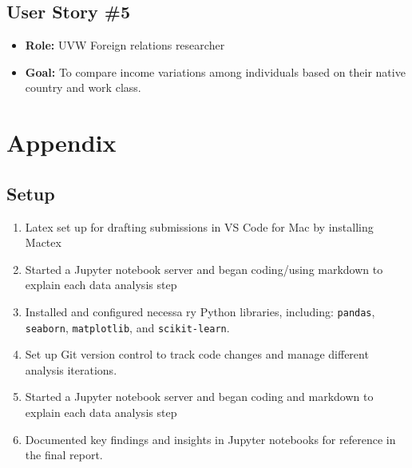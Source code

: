 \documentclass[journal,onecolumn]{IEEEtran}
\begin{document}
\subsection{User Story \#5}
\begin{itemize}
    \item \textbf{Role:} UVW Foreign relations researcher
    \item \textbf{Goal:} To compare income variations among individuals based on their native country and work class.
\end{itemize}


\section{Appendix}
\subsection{Setup}
\begin{enumerate}
    \item Latex set up for drafting submissions in VS Code for Mac by installing Mactex
    \item Started a Jupyter notebook server and began coding/using markdown to explain each data analysis step
    \item Installed and configured necessa  ry Python libraries, including: 
    \texttt{pandas}, \texttt{seaborn}, \texttt{matplotlib}, and 
    \texttt{scikit-learn}.
    \item Set up Git version control to track code changes and manage different analysis iterations.
    \item Started a Jupyter notebook server and began coding and markdown to explain each data analysis step
    \item Documented key findings and insights in Jupyter notebooks for reference in the final report.
\end{enumerate}
\end{document}
